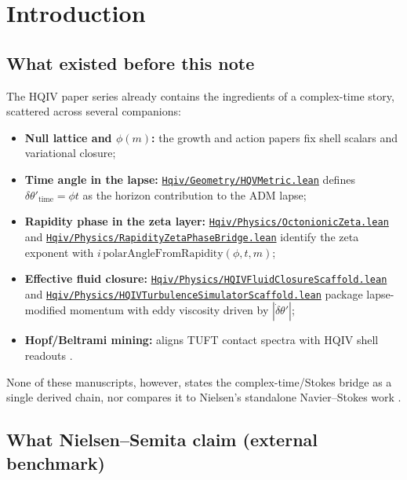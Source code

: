 \documentclass[11pt]{amsart}
\newcommand{\leanrepo}{https://github.com/HQIV/hqiv-lean/blob/main}
\newcommand{\leanfile}[1]{\href{\leanrepo/#1}{\nolinkurl{#1}}}
\begin{document}
\maketitle



\section{Introduction}
\label{sec:intro}

\subsection{What existed before this note}

The HQIV paper series already contains the ingredients of a complex-time story, scattered across
several companions:
\begin{itemize}[leftmargin=2em]
\item \textbf{Null lattice and $\phi(m)$:} the growth and action papers
  \cite{hqiv-3d-growth-paper,hqiv-oct-action-paper} fix shell scalars and variational closure;
\item \textbf{Time angle in the lapse:} \leanfile{Hqiv/Geometry/HQVMetric.lean} defines
  $\delta\theta'_{\mathrm{time}}=\phi t$ as the horizon contribution to the ADM lapse;
\item \textbf{Rapidity phase in the zeta layer:} \leanfile{Hqiv/Physics/OctonionicZeta.lean} and
  \leanfile{Hqiv/Physics/RapidityZetaPhaseBridge.lean} identify the zeta exponent with
  $i\,\mathrm{polarAngleFromRapidity}(\phi,t,m)$;
\item \textbf{Effective fluid closure:} \leanfile{Hqiv/Physics/HQIVFluidClosureScaffold.lean} and
  \leanfile{Hqiv/Physics/HQIVTurbulenceSimulatorScaffold.lean} package lapse-modified momentum with
  eddy viscosity driven by $|\dot\delta\theta'|$;
\item \textbf{Hopf/Beltrami mining:} \cite{hqiv-tuft-bridge-paper} aligns TUFT contact spectra with
  HQIV shell readouts \cite{NielsenTUFT2026}.
\end{itemize}
None of these manuscripts, however, states the complex-time/Stokes bridge as a single derived chain,
nor compares it to Nielsen's standalone Navier--Stokes work
\cite{NielsenSemitaNS2026,NielsenBeltramiComplexTime2026}.

\subsection{What Nielsen--Semita claim (external benchmark)}
\end{document}
